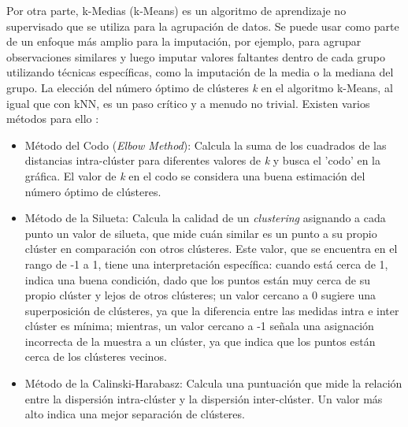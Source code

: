 Por otra parte, k-Medias (k-Means) es un algoritmo de aprendizaje no supervisado que se utiliza para la agrupación de datos. Se puede usar como parte de un enfoque más amplio para la imputación, por ejemplo, para agrupar observaciones similares y luego imputar valores faltantes dentro de cada grupo utilizando técnicas específicas, como la imputación de la media o la mediana del grupo. La elección del número óptimo de clústeres \textit{k} en el algoritmo k-Means, al igual que con kNN, es un paso crítico y a menudo no trivial. Existen varios métodos para ello \citep{bonaccorso2017machine}:

\begin{itemize}
	\item Método del Codo (\textit{Elbow Method}): Calcula la suma de los cuadrados de las distancias intra-clúster para diferentes valores de \textit{k} y busca el 'codo' en la gráfica.  El valor de \textit{k} en el codo se considera una buena estimación del número óptimo de clústeres.
    \item Método de la Silueta: Calcula la calidad de un \textit{clustering} asignando a cada punto un valor de silueta, que mide cuán similar es un punto a su propio clúster en comparación con otros clústeres. Este valor, que se encuentra en el rango de -1 a 1, tiene una interpretación específica: cuando está cerca de 1, indica una buena condición, dado que  los puntos están muy cerca de su propio clúster y lejos de otros clústeres; un valor cercano a 0 sugiere una superposición de clústeres, ya que la diferencia entre las medidas intra e inter clúster es mínima; mientras, un valor cercano a -1 señala una asignación incorrecta de la muestra a un clúster, ya que indica que los puntos están cerca de los clústeres vecinos.
    \item Método de la Calinski-Harabasz: Calcula una puntuación que mide la relación entre la dispersión intra-clúster y la dispersión inter-clúster. Un valor más alto indica una mejor separación de clústeres.
\end{itemize}

